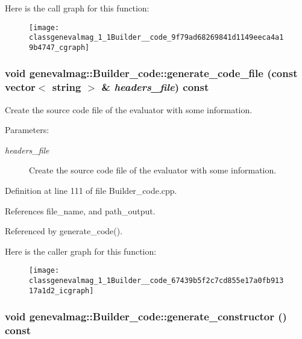 Here is the call graph for this function:\nopagebreak
\begin{figure}[H]
\begin{center}
\leavevmode
\texttt{[image: classgenevalmag\_1\_1Builder\_\_code\_9f79ad68269841d1149eeca4a19b4747\_cgraph]}
\end{center}
\end{figure}
\hypertarget{classgenevalmag_1_1Builder__code_67439b5f2c7cd855e17a0fb91317a1d2}{
\subsubsection[{generate\_\-code\_\-file}]{\setlength{\rightskip}{0pt plus 5cm}void genevalmag::Builder\_\-code::generate\_\-code\_\-file (const vector$<$ string $>$ \& {\em headers\_\-file}) const}}
\label{classgenevalmag_1_1Builder__code_67439b5f2c7cd855e17a0fb91317a1d2}


Create the source code file of the evaluator with some information. \begin{Desc}
\item[Parameters:]
\begin{description}
\item[{\em headers\_\-file}]Create the source code file of the evaluator with some information. \end{description}
\end{Desc}


Definition at line 111 of file Builder\_\-code.cpp.

References file\_\-name, and path\_\-output.

Referenced by generate\_\-code().

Here is the caller graph for this function:\nopagebreak
\begin{figure}[H]
\begin{center}
\leavevmode
\texttt{[image: classgenevalmag\_1\_1Builder\_\_code\_67439b5f2c7cd855e17a0fb91317a1d2\_icgraph]}
\end{center}
\end{figure}
\hypertarget{classgenevalmag_1_1Builder__code_c390149dae2358dda72ff8360f30c693}{
\subsubsection[{generate\_\-constructor}]{\setlength{\rightskip}{0pt plus 5cm}void genevalmag::Builder\_\-code::generate\_\-constructor () const}}
\label{classgenevalmag_1_1Builder__code_c390149dae2358dda72ff8360f30c693}


